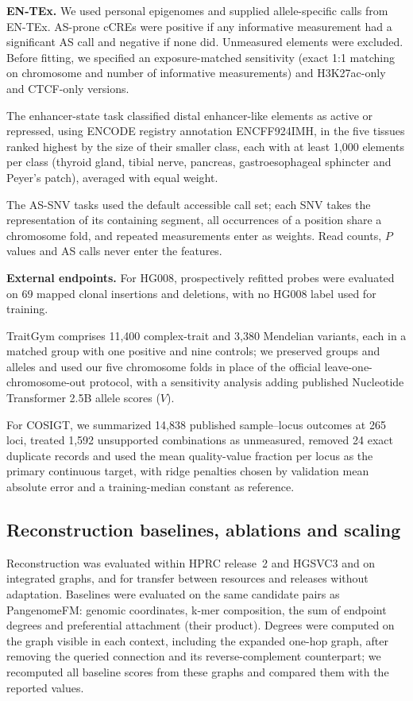 \documentclass[11pt]{article}
\newcommand{\method}{PangenomeFM\xspace}
\begin{document}
\begin{bibunit}[unsrtnat]
\textbf{EN-TEx.} We used personal epigenomes and supplied allele-specific calls from EN-TEx\cite{rozowsky2023entex}. AS-prone cCREs were positive if any informative measurement had a significant AS call and negative if none did. Unmeasured elements were excluded. Before fitting, we specified an exposure-matched sensitivity (exact 1:1 matching on chromosome and number of informative measurements) and H3K27ac-only and CTCF-only versions.

The enhancer-state task classified distal enhancer-like elements as active or repressed, using ENCODE registry annotation ENCFF924IMH, in the five tissues ranked highest by the size of their smaller class, each with at least 1,000 elements per class (thyroid gland, tibial nerve, pancreas, gastroesophageal sphincter and Peyer's patch), averaged with equal weight.

The AS-SNV tasks used the default accessible call set; each SNV takes the representation of its containing segment, all occurrences of a position share a chromosome fold, and repeated measurements enter as weights. Read counts, $P$ values and AS calls never enter the features.

\textbf{External endpoints.} For HG008, prospectively refitted probes were evaluated on 69 mapped clonal insertions and deletions, with no HG008 label used for training.

TraitGym\cite{benegas2025traitgym} comprises 11,400 complex-trait and 3,380 Mendelian variants, each in a matched group with one positive and nine controls; we preserved groups and alleles and used our five chromosome folds in place of the official leave-one-chromosome-out protocol, with a sensitivity analysis adding published Nucleotide Transformer 2.5B allele scores ($V$).

For COSIGT\cite{bolognini2026cosigt}, we summarized 14,838 published sample--locus outcomes at 265 loci, treated 1,592 unsupported combinations as unmeasured, removed 24 exact duplicate records and used the mean quality-value fraction per locus as the primary continuous target, with ridge penalties chosen by validation mean absolute error and a training-median constant as reference.

\subsection{Reconstruction baselines, ablations and scaling}
\label{sec:baselines-methods}

Reconstruction was evaluated within HPRC release~2 and HGSVC3 and on integrated graphs, and for transfer between resources and releases without adaptation. Baselines were evaluated on the same candidate pairs as \method: genomic coordinates, k-mer composition, the sum of endpoint degrees and preferential attachment (their product). Degrees were computed on the graph visible in each context, including the expanded one-hop graph, after removing the queried connection and its reverse-complement counterpart; we recomputed all baseline scores from these graphs and compared them with the reported values.


\end{bibunit}
\end{document}
